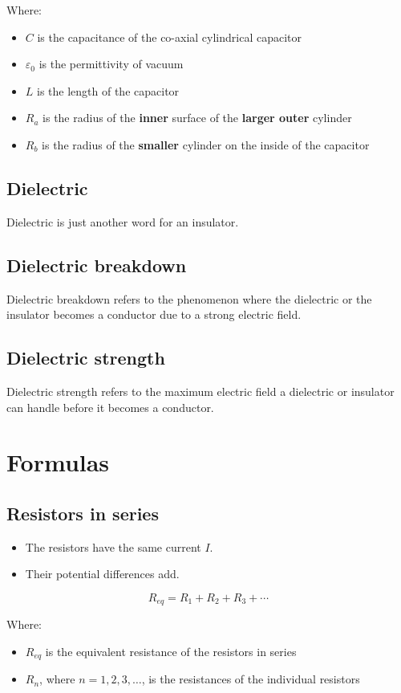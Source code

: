 \documentclass[11pt]{article}
\begin{document}
Where:
\begin{itemize}
\item \(C\) is the capacitance of the co-axial cylindrical capacitor
\item \(\varepsilon_0\) is the permittivity of vacuum
\item \(L\) is the length of the capacitor
\item \(R_a\) is the radius of the \textbf{inner} surface of the \textbf{larger outer} cylinder
\item \(R_b\) is the radius of the \textbf{smaller} cylinder on the inside of the capacitor
\end{itemize}
\subsection{Dielectric}
\label{sec:org3ed681d}
Dielectric is just another word for an insulator.
\subsection{Dielectric breakdown}
\label{sec:orgff266fa}
Dielectric breakdown refers to the phenomenon where the dielectric or the insulator becomes a conductor due to a strong electric field.
\subsection{Dielectric strength}
\label{sec:orgbb7985c}
Dielectric strength refers to the maximum electric field a dielectric or insulator can handle before it becomes a conductor.
\section{Formulas}
\label{sec:org27f7da7}

\subsection{Resistors in series}
\label{sec:org2278f0a}
\begin{itemize}
\item The resistors have the same current \(I\).
\item Their potential differences add.
\end{itemize}
\[R_{eq} = R_1 + R_2 + R_3 + \cdots\]

Where:
\begin{itemize}
\item \(R_{eq}\) is the equivalent resistance of the resistors in series
\item \(R_n\), where \(n = 1, 2, 3, \ldots\), is the resistances of the individual resistors
\end{itemize}
\end{document}
